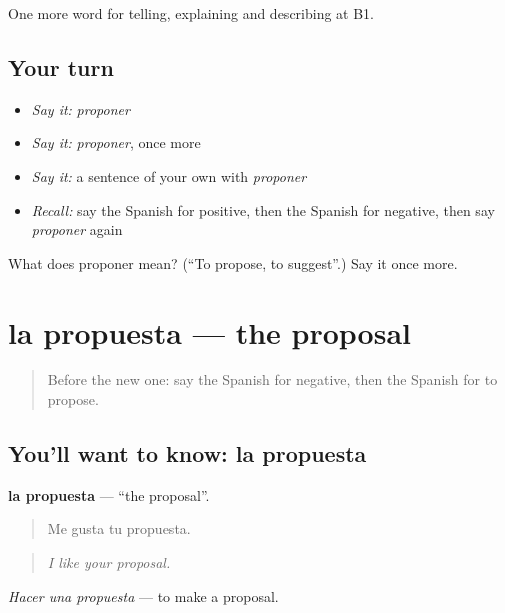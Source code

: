 \begin{grammarlens}[title={What you've built}]
One more word for telling, explaining and describing at B1.
\end{grammarlens}

\subsection*{Your turn}
\begin{itemize}
\raggedright
  \item \emph{Say it:} \emph{proponer}
  \item \emph{Say it:} \emph{proponer}, once more
  \item \emph{Say it:} a sentence of your own with \emph{proponer}
  \item \emph{Recall:} say the Spanish for positive, then the Spanish for negative, then say \emph{proponer} again
\end{itemize}

\begin{tcolorbox}[breakable,colback=teal!4,colframe=teal!35!black,title={Before you move on}]
What does proponer mean? (\textquotedblleft{}To propose, to suggest\textquotedblright{}.) Say it once more.
\end{tcolorbox}
\section[la propuesta]{la propuesta — the proposal}

\label{lesson:ES-C585-propuesta}



\begin{quote}
Before the new one: say the Spanish for negative, then the Spanish for to propose.
\end{quote}

\subsection*{You'll want to know: la propuesta}
\textbf{la propuesta} — \textquotedblleft{}the proposal\textquotedblright{}.

\begin{quote}
Me gusta tu propuesta.
\end{quote}

\begin{quote}
\emph{I like your proposal.}
\end{quote}

\emph{Hacer una propuesta} — to make a proposal.

